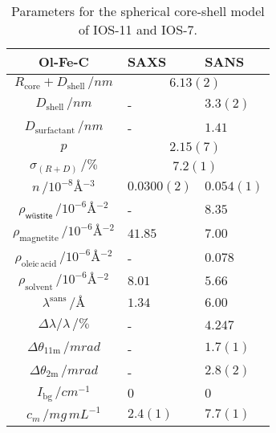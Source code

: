 \documentclass[\main/dresen_thesis.tex]{subfiles}
\begin{document}
  \begin{table}[!htbp]
    \centering
    \caption{\label{tab:colloidalCrystals:nanoparticle:sas}Parameters for the spherical core-shell model of IOS-11 and IOS-7.}
    \begin{tabular}{ c | l | l}
      \rule{0pt}{2ex} \textbf{Ol-Fe-C} & \textbf{SAXS} & \textbf{SANS}\\
      \hline
      \rule{0pt}{2ex} $R_\mathrm{core} + D_\mathrm{shell} \, / \unit{nm}$             & \multicolumn{2}{c}{$6.13(2)$} \\
      \rule{0pt}{2ex} $D_\mathrm{shell}\, / \unit{nm}$                                & -            & $3.3(2)$       \\
      \rule{0pt}{2ex} $D_\mathrm{surfactant}\, / \unit{nm}$                           & -            & $1.41$         \\
      \rule{0pt}{2ex} $p $                                                            & \multicolumn{2}{c}{$2.15(7)$} \\
      \rule{0pt}{2ex} $\sigma_{(R+D)}\, / \unit{\%}$                                  & \multicolumn{2}{c}{$7.2(1)$} \\
      \rule{0pt}{2ex} $n \, / \unit{10^{-8} \angstrom^{-3}}$                          & $0.0300(2)$  &  $0.054(1)$ \\
      \hline
      \rule{0pt}{2ex} $\rho_\textsf{w\"ustite} \, / \unit{10^{-6} \angstrom^{-2}}$    & -       & $8.35$\\
      \rule{0pt}{2ex} $\rho_\mathrm{magnetite} \, / \unit{10^{-6} \angstrom^{-2}}$    & $41.85$ & $7.00$\\
      \rule{0pt}{2ex} $\rho_\mathrm{oleic\, acid} \, / \unit{10^{-6} \angstrom^{-2}}$ & -       & $0.078$\\
      \rule{0pt}{2ex} $\rho_\mathrm{solvent} \, / \unit{10^{-6} \angstrom^{-2}}$      & $8.01$  & $5.66$\\
      \hline
      \rule{0pt}{2ex} $\lambda^\mathrm{sans} \, / \unit{\unit{\angstrom}}$            & $1.34$  & $6.00$\\
      \rule{0pt}{2ex} $\Delta \lambda / \lambda \, / \unit{\%}$                       & -       & $4.247$\\
      \rule{0pt}{2ex} $\Delta \theta_\mathrm{11 m} \, / \unit{mrad}$                  & -       & $1.7(1)$\\
      \rule{0pt}{2ex} $\Delta \theta_\mathrm{2 m} \, / \unit{mrad}$                   & -       & $2.8(2)$\\
      \rule{0pt}{2ex} $I_\mathrm{bg} \, / \unit{cm^{-1}}$                             & $0$     & $0$\\
      \hline
      \rule{0pt}{2ex} $c_m \, / \unit{mg\, mL^{-1}}$                                  & $2.4(1)$ & $7.7(1)$\\
      \hline
    \end{tabular}
  \end{table}
\end{document}
